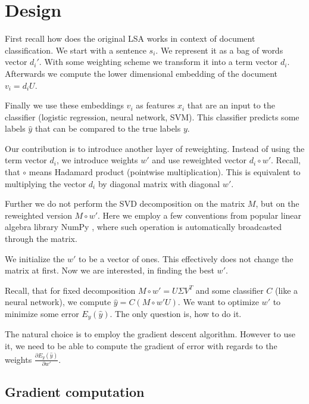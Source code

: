 \section{Design}

    First recall how does the original LSA works in context of document classification.
    We start with a sentence $s_i$. We represent it as a bag of words vector $d_i'$. 
    With some weighting scheme we transform it into a term vector $d_i$.
    Afterwards we compute the lower dimensional embedding of the document $v_i = d_i U$. 
    
    Finally we use these embeddings $v_i$ as features $x_i$ that are an input to the classifier (logistic regression, neural network, SVM).
    This classifier predicts some labels $\hat{y}$ that can be compared to
    the true labels $y$.
    
    Our contribution is to introduce another layer of reweighting. 
    Instead of using the term vector $d_i$, we introduce weights $w'$ and use reweighted vector $d_i \circ w'$.
    Recall, that $\circ$ means Hadamard product (pointwise multiplication).
    This is equivalent to multiplying the vector $d_i$ by diagonal matrix with diagonal $w'$.
    
    Further we do not perform the SVD decomposition on the matrix $M$, 
    but on the reweighted version $M \circ w'$. 
    Here we employ a few conventions from popular linear algebra library NumPy \cite{oliphant2006guide}, 
    where such operation is automatically broadcasted through the matrix.
    
    We initialize the $w'$ to be a vector of ones. 
    This effectively does not change the matrix at first.
    Now we are interested, in finding the best $w'$. 
    
    Recall, that for fixed decomposition $M\circ w'= U\Sigma V^T$ and some classifier $C$ (like a neural network),
    we compute $\hat{y} = C(M \circ w' U)$.
    We want to optimize $w'$ to minimize some error $E_y(\hat{y})$.
    The only question is, how to do it.
    
    The natural choice is to employ the gradient descent algorithm. 
    However to use it, we need to be able to compute the gradient of error with regards to the weights $\frac{\partial E_y(\hat{y})}{\partial w'}$.
    
    \subsection{Gradient computation}
    
